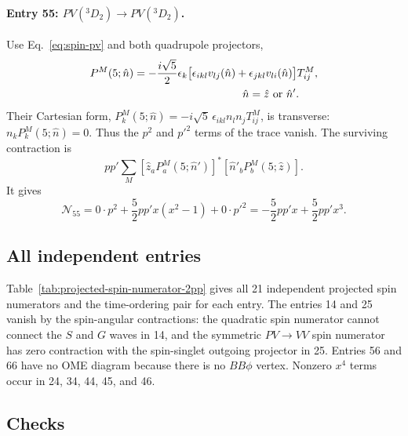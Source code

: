 \paragraph{Entry 55: $PV({}^3D_2)\to PV({}^3D_2)$.}
Use Eq.~\eqref{eq:spin-pv} and both quadrupole projectors,
\begin{equation}
\begin{split}
 P^M(5;\hat n)&=-\frac{i\sqrt5}{2}\epsilon_k
 \bigl[\epsilon_{ikl}v_{lj}(\hat n)
 +\epsilon_{jkl}v_{li}(\hat n)\bigr]T^M_{ij},\\
 &\hspace{35mm}\hat n=\hat z\ \hbox{or}\ \hat n'.
\end{split}
\end{equation}
Their Cartesian form,
$P^M_k(5;\hat n)=-i\sqrt5\,\epsilon_{ikl}n_ln_jT^M_{ij}$,
is transverse: $n_kP_k^M(5;\hat n)=0$.
Thus the $p^2$ and $p'^2$ terms of the trace vanish. The surviving
contraction is
\begin{equation}
 pp'\sum_M[\hat z_aP_a^M(5;\hat n')]^*
 [\hat n'_bP_b^M(5;\hat z)].
\end{equation}
It gives
\begin{equation}
 \mathcal N_{55}=0\cdot p^2+\frac52pp'x(x^2-1)+0\cdot p'^2
 =-\frac52pp'x+\frac52pp'x^3.
\end{equation}

\subsection{All independent entries}

Table~\ref{tab:projected-spin-numerator-2pp} gives all 21 independent
projected spin numerators and the time-ordering pair for each entry.
The entries 14 and 25 vanish by the spin-angular contractions: the
quadratic spin numerator cannot connect the $S$ and $G$ waves in 14,
and the symmetric $PV\to VV$ spin numerator has zero contraction with
the spin-singlet outgoing projector in 25. Entries 56 and 66 have no
OME diagram because there is no $BB\phi$ vertex. Nonzero $x^4$ terms
occur in 24, 34, 44, 45, and 46.


\subsection{Checks}


